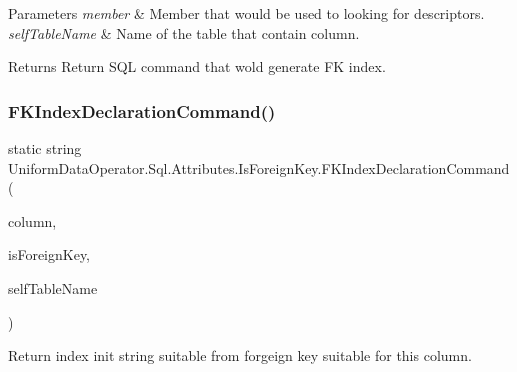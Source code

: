 \begin{DoxyParams}{Parameters}
{\em member} & Member that would be used to looking for descriptors.\\
\hline
{\em self\+Table\+Name} & Name of the table that contain column.\\
\hline
\end{DoxyParams}
\begin{DoxyReturn}{Returns}
Return S\+QL command that wold generate FK index.
\end{DoxyReturn}
\mbox{\label{class_uniform_data_operator_1_1_sql_1_1_attributes_1_1_is_foreign_key_a6becd6dc4bd6df070252b152a57f0152}} 
\subsubsection{\texorpdfstring{F\+K\+Index\+Declaration\+Command()}{FKIndexDeclarationCommand()}\hspace{0.1cm}{\footnotesize\ttfamily [2/2]}}
{\footnotesize\ttfamily static string Uniform\+Data\+Operator.\+Sql.\+Attributes.\+Is\+Foreign\+Key.\+F\+K\+Index\+Declaration\+Command (\begin{DoxyParamCaption}\item[{\mbox{\hyperlink{class_uniform_data_operator_1_1_sql_1_1_attributes_1_1_column}{Column}}}]{column,  }\item[{\mbox{\hyperlink{class_uniform_data_operator_1_1_sql_1_1_attributes_1_1_is_foreign_key}{Is\+Foreign\+Key}}}]{is\+Foreign\+Key,  }\item[{string}]{self\+Table\+Name }\end{DoxyParamCaption})\hspace{0.3cm}{\ttfamily [static]}}



Return index init string suitable from forgeign key suitable for this column. 



